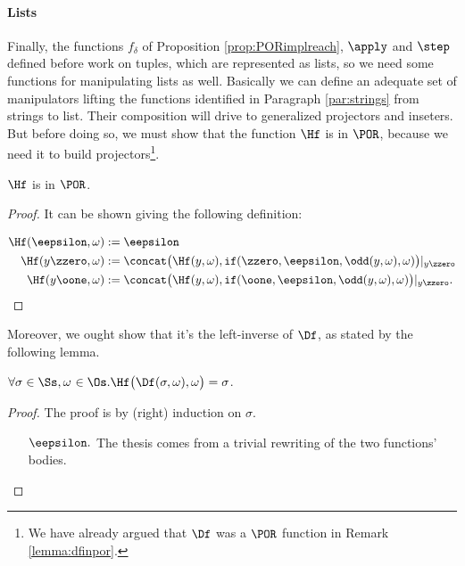 \begin{conditional}{\notappendix}
\begin{remark}
  \end{remark}



  \paragraph{Lists}

  Finally, the functions $f_\delta$ of Proposition \ref{prop:PORimplreach},
  $\apply$ and $\step$ defined before work on tuples, which are represented as
  lists, so we need some functions for manipulating lists as well.
  Basically we can define an adequate set of manipulators
  lifting the functions identified in Paragraph \ref{par:strings} from strings
  to list. Their composition will drive to generalized
  projectors and inseters.
  But before doing so, we must show that the function $\Hf$ is in $\POR$,
  because we need it to build projectors\footnote{We
   have already argued that $\Df$ was a $\POR$ function in Remark
  \ref{lemma:dfinpor}.}.
  \begin{lemma}
    $\Hf$ is in $\POR$.
  \end{lemma}
  \begin{proof}
    It can be shown giving the following definition:

    \begin{align*}
    \Hf(\eepsilon,\omega) &:= \eepsilon \\
    \Hf(y\zzero, \omega) &:= \concat\big(\Hf(y,\omega),
    {\mathtt{if}}(\zzero,\eepsilon,
    \odd(y,\omega),\omega)\big){|_{y\zzero}} \\
    \Hf(y\oone,\omega) &:=
    \concat\big(\Hf(y,\omega), {\mathtt{if}}
    (\oone,\eepsilon,\odd(y,\omega),\omega)\big)
    {|_{y\zzero}}.
    \end{align*}
  \end{proof}
  Moreover, we ought show that it's the left-inverse of $\Df$, as stated by
  the following lemma.

  \begin{lemma}
    \label{lemma:dhleftinverse}
  $\forall \sigma \in {\Ss},
  \omega \ { \in \Os.} \Hf\big(\Df(\sigma,\omega),\omega\big)
  =\sigma$.
  \end{lemma}
  \begin{proof}
  The proof is by (right) induction on $\sigma$.
  \begin{itemize}
  \itemsep0em

  \item[$\eepsilon.$] The thesis comes from a trivial
  rewriting of the two functions' bodies.


\end{itemize}
\end{proof}
\end{conditional}
